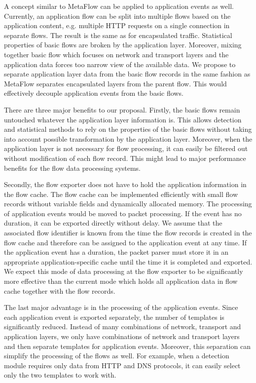 A concept similar to MetaFlow can be applied to application events as well. Currently, an application flow can be split into multiple flows based on the application content, e.g. multiple HTTP requests on a single connection in separate flows. The result is the same as for encapsulated traffic. Statistical properties of basic flows are broken by the application layer. Moreover, mixing together basic flow which focuses on network and transport layers and the application data forces too narrow view of the available data. We propose to separate application layer data from the basic flow records in the same fashion as MetaFlow separates encapsulated layers from the parent flow. This would effectively decouple application events from the basic flows.

There are three major benefits to our proposal. Firstly, the basic flows remain untouched whatever the application layer information is. This allows detection and statistical methods to rely on the properties of the basic flows without taking into account possible transformation by the application layer. Moreover, when the application layer is not necessary for flow processing, it can easily be filtered out without modification of each flow record. This might lead to major performance benefits for the flow data processing systems.

Secondly, the flow exporter does not have to hold the application information in the flow cache. The flow cache can be implemented efficiently with small flow records without variable fields and dynamically allocated memory. The processing of application events would be moved to packet processing. If the event has no duration, it can be exported directly without delay. We assume that the associated flow identifier is known from the time the flow records is created in the flow cache and therefore can be assigned to the application event at any time. If the application event has a duration, the packet parser must store it in an appropriate application-specific cache until the time it is completed and exported. We expect this mode of data processing at the flow exporter to be significantly more effective than the current mode which holds all application data in flow cache together with the flow records.

The last major advantage is in the processing of the application events. Since each application event is exported separately, the number of templates is significantly reduced. Instead of many combinations of network, transport and application layers, we only have combinations of network and transport layers and then separate templates for application events. Moreover, this separation can simplify the processing of the flows as well. For example, when a detection module requires only data from HTTP and DNS protocols, it can easily select only the two templates to work with. 

